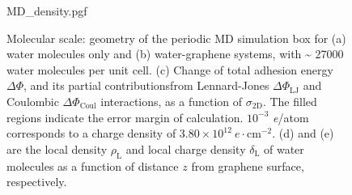 \begin{figure}[!htbp]
\centering
{MD_density.pgf}
\caption{\label{fig:wet-MD-res2}  Molecular scale: geometry of the periodic
  MD simulation box for (a) water molecules only and (b)
  water-graphene systems, with \textasciitilde{} 27000 water molecules
  per unit cell. (c) Change of total adhesion energy \(\Delta\Phi\),
  and its partial contributionsfrom Lennard-Jones
  \(\Delta\Phi_{\mathrm{LJ}}\) and Coulombic
  \(\Delta\Phi_{\mathrm{Coul}}\) interactions, as a function of
  \(\sigma_{\mathrm{2D}}\). The filled regions indicate the error
  margin of calculation. \(10^{-3}\) \textit{e}/atom corresponds to a
  charge density of \(3.80 \times 10^{12}\ e \cdot
  \mathrm{cm}^{-2}\). (d) and (e) are the local density
  \(\rho_{\mathrm{L}}\) and local charge density
  \(\delta_{\mathrm{L}}\) of water molecules as a function of distance
  \(z\) from graphene surface, respectively.}
\end{figure}


